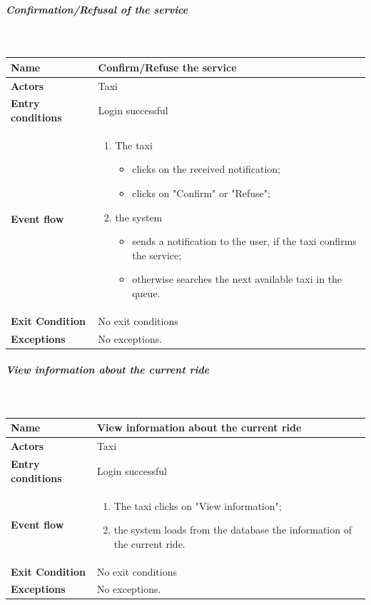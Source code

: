 		\newpage
		\subparagraph{Confirmation/Refusal of the service}
		~\\[0.2cm]
		\vspace{20pt}
		\noindent
		\begin{tabular}{l l}
		 \textbf {Name} & Confirm/Refuse the service  \\ \hline
		 \textbf{Actors} & Taxi \\ \hline
		 \textbf{Entry conditions} & Login successful \\ \hline
		 \textbf{Event flow} & 
		 \parbox{0.7\textwidth}{
		 \begin{enumerate}
		 \item The taxi
		 \begin{itemize}
		 \item clicks on the received notification;
		 \item clicks on "Confirm" or "Refuse";
		 \end{itemize}
		 \item the system
		  \begin{itemize}
		 \item sends a notification to the user, if the taxi confirms the service;
		 \item otherwise searches the next available taxi in the queue.
		 \end{itemize}
		 \end{enumerate}
		 } \\ \hline
		 \textbf{Exit Condition} & No exit conditions \\ \hline
		 \textbf{Exceptions} & No exceptions.
		\end{tabular}
		
		\subparagraph{View information about the current ride}
		~\\[0.2cm]
		\vspace{20pt}
		\noindent
		\begin{tabular}{l l}
		 \textbf {Name} & View information about the current ride  \\ \hline
		 \textbf{Actors} & Taxi \\ \hline
		 \textbf{Entry conditions} & Login successful \\ \hline
		 \textbf{Event flow} & 
		 \parbox{0.7\textwidth}{
		 \begin{enumerate}
		 \item The taxi clicks on "View information";
		 \item the system loads from the database the information of the current ride.
		 \end{enumerate}
		 } \\ \hline
		 \textbf{Exit Condition} & No exit conditions \\ \hline
		 \textbf{Exceptions} & No exceptions.
		\end{tabular}
		
